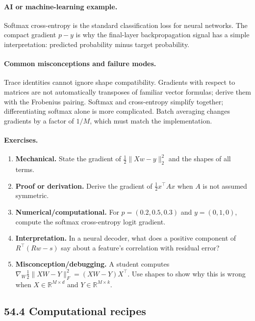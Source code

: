 \paragraph{AI or machine-learning example.}
Softmax cross-entropy is the standard classification loss for neural networks. The compact gradient \(p-y\) is why the final-layer backpropagation signal has a simple interpretation: predicted probability minus target probability.

\paragraph{Common misconceptions and failure modes.}
Trace identities cannot ignore shape compatibility. Gradients with respect to matrices are not automatically transposes of familiar vector formulas; derive them with the Frobenius pairing. Softmax and cross-entropy simplify together; differentiating softmax alone is more complicated. Batch averaging changes gradients by a factor of \(1/M\), which must match the implementation.

\paragraph{Exercises.}
\begin{enumerate}[label=\textbf{54.3.\arabic*.}, leftmargin=*]
\item \textbf{Mechanical.} State the gradient of \(\frac12\|Xw-y\|_2^2\) and the shapes of all terms.
\item \textbf{Proof or derivation.} Derive the gradient of \(\frac12 x^\top A x\) when \(A\) is not assumed symmetric.
\item \textbf{Numerical/computational.} For \(p=(0.2,0.5,0.3)\) and \(y=(0,1,0)\), compute the softmax cross-entropy logit gradient.
\item \textbf{Interpretation.} In a neural decoder, what does a positive component of \(R^\top(Rw-s)\) say about a feature's correlation with residual error?
\item \textbf{Misconception/debugging.} A student computes \(\nabla_W \frac12\|XW-Y\|_F^2=(XW-Y)X^\top\). Use shapes to show why this is wrong when \(X\in\mathbb R^{M\times d}\) and \(Y\in\mathbb R^{M\times k}\).
\end{enumerate}

\subsection{54.4 Computational recipes}

